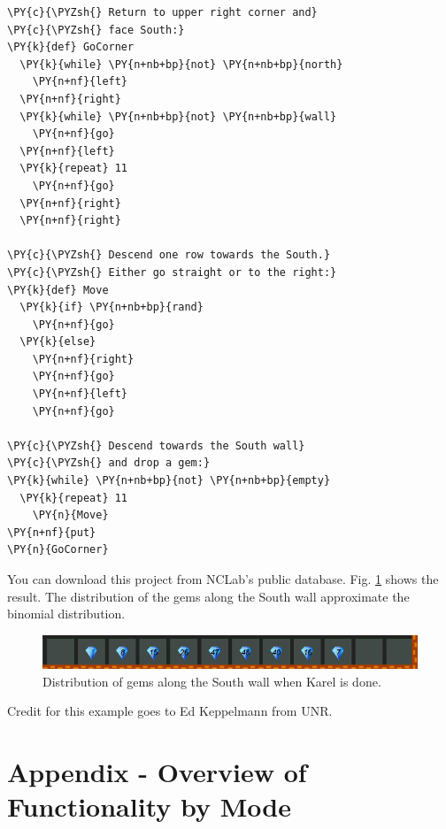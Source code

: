 \begin{bbox}
\begin{Verbatim}[commandchars=\\\{\}]
\PY{c}{\PYZsh{} Return to upper right corner and}
\PY{c}{\PYZsh{} face South:}
\PY{k}{def} GoCorner
  \PY{k}{while} \PY{n+nb+bp}{not} \PY{n+nb+bp}{north}
    \PY{n+nf}{left}
  \PY{n+nf}{right}
  \PY{k}{while} \PY{n+nb+bp}{not} \PY{n+nb+bp}{wall}
    \PY{n+nf}{go}
  \PY{n+nf}{left}
  \PY{k}{repeat} 11
    \PY{n+nf}{go}
  \PY{n+nf}{right}
  \PY{n+nf}{right}

\PY{c}{\PYZsh{} Descend one row towards the South.}
\PY{c}{\PYZsh{} Either go straight or to the right:}
\PY{k}{def} Move
  \PY{k}{if} \PY{n+nb+bp}{rand}
    \PY{n+nf}{go}
  \PY{k}{else}
    \PY{n+nf}{right}
    \PY{n+nf}{go}
    \PY{n+nf}{left}
    \PY{n+nf}{go}

\PY{c}{\PYZsh{} Descend towards the South wall}
\PY{c}{\PYZsh{} and drop a gem:}
\PY{k}{while} \PY{n+nb+bp}{not} \PY{n+nb+bp}{empty}
  \PY{k}{repeat} 11
    \PY{n}{Move}
\PY{n+nf}{put}
\PY{n}{GoCorner}

\end{Verbatim}
\end{bbox}
\vspace{6mm}
\hfill

\newpage
\noindent
You can download this project from NCLab's public database.
Fig. \ref{fig:binomial2} shows the result. The distribution of the 
gems along the South wall approximate the binomial distribution. 

\begin{figure}[!ht]
\begin{center}
\includegraphics[width=14cm]{img/binomial2.png}
\vspace{-0mm}
\caption{Distribution of gems along the South wall when Karel is done.}
\label{fig:binomial2}
\end{center}
\end{figure}

\noindent
Credit for this example goes to Ed Keppelmann from UNR. 



\section{Appendix - Overview of Functionality by Mode}\label{sec:newfunc3}

